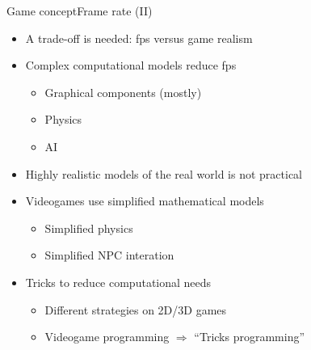 \documentclass[10pt,compress]{beamer} %
\begin{document}
\begin{frame}{Game concept}{Frame rate (II)}
	\begin{itemize}
	\item A trade-off is needed: fps versus game realism
	\item Complex computational models reduce fps
		\begin{itemize}
		\item Graphical components (mostly)
		\item Physics
		\item AI
		\end{itemize}
	\item Highly realistic models of the real world is not practical
	\item Videogames use simplified mathematical models
		\begin{itemize}
		\item Simplified physics
		\item Simplified NPC interation
		\end{itemize}
	\item Tricks to reduce computational needs
		\begin{itemize}
		\item Different strategies on 2D/3D games
		\item Videogame programming $\Rightarrow$ ``Tricks programming''
		\end{itemize}
	\end{itemize}
\end{frame}
\end{document}
